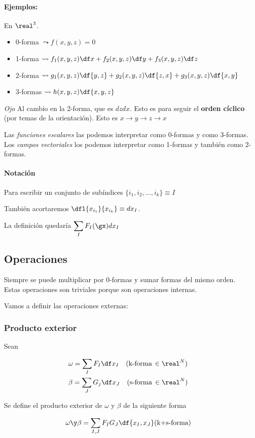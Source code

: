 \paragraph{Ejemplos:} En $\real^3$.

\begin{itemize}
\item 0-forma $\leadsto f(x,y,z) = 0$
\item 1-forma $\leadsto f_1(x,y,z)\df x + f_2(x,y,z)\df y + f_3(x,y,z)\df z$
\item 2-forma $\leadsto g_1(x,y,z)\df{y,z} + g_2(x,y,z)\df{z,x} + g_3(x,y,z)\df{x,y}$
\item 3-formas $\leadsto h(x,y,z)\df{x,y,z}$
\end{itemize}

\emph{Ojo} Al cambio en la 2-forma, que es $dzdx$. Esto es para seguir el \textbf{orden cíclico} (por temas de la orientación). Esto es $x\to y \to z \to x$


\obs Las \textit{funciones escalares} las podemos interpretar como 0-formas y como 3-formas. Los \textit{campos vectoriales} los podemos interpretar como 1-formas y también como 2-formas.

\paragraph{Notación}
Para escribir un conjunto de subíndices $\{i_1,i_2,...,i_k\} \equiv I$

También acortaremos $\dfl{x_{i_1}}{x_{i_k}} \equiv dx_I$.

La definición quedaría $\displaystyle \sum_I F_I(\gx)dx_I$

\subsection{Operaciones}
Siempre se puede multiplicar por 0-formas y sumar formas del mismo orden. Estas operaciones son triviales porque son operaciones internas.

Vamos a definir las operaciones externas:

\subsubsection{Producto exterior}

\begin{defn}
Sean

\begin{gather*}
\omega = \sum_I F_I \df x_I\quad (\text{k-forma}\,\in\real^N) \\
\beta = \sum_J G_j \df x_J\quad (\text{s-forma}\,\in\real^N)
\end{gather*}

Se define el producto exterior de $ω$ y $β$ de la siguiente forma

\[\omega\y\beta = \sum_{I,J} F_IG_J \df{x_I,x_J} (\text{k+s-forma})\]
\end{defn}

